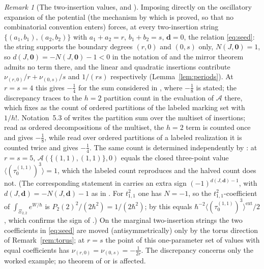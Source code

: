 \documentclass[11pt]{amsart}
\theoremstyle{definition}
\theoremstyle{remark}
\newtheorem{remark}[theorem]{Remark}
\newcommand{\Ascr}{\mathcal{A}}
\begin{document}
\begin{remark}[The two-insertion values, and {\cite[Ex.~5.5]{GKTsurvey}}]
\label{rem:ex55}
Imposing \cite[Thm.~0.3]{GKT} directly on the oscillatory expansion of the
potential (the mechanism by which \cite[Thm.~0.2]{GKT} is proved, so that no
combinatorial convention enters) forces, at every two-insertion string
$\{(a_{1},b_{1}),(a_{2},b_{2})\}$ with $a_{1}{+}a_{2}=r$, $b_{1}{+}b_{2}=s$,
$\mathbf d=0$, the relation \eqref{eq:seed}: the string supports the boundary
degrees $(r,0)$ and $(0,s)$ only, $N(J,\mathbf 0)=1$, so
$d(J,\mathbf 0)=-N(J,\mathbf 0)-1<0$ in the notation of \cite[Def.~4.8]{GKT} and
the mirror theorem admits no term there, and the linear and quadratic insertions contribute
$\nu_{(r,0)}/r+\nu_{(0,s)}/s$ and $1/(rs)$ respectively
(Lemma~\ref{lem:periods}).
At $r=s=4$ this gives $-\tfrac14$ for the sum considered in
\cite[Ex.~5.5]{GKTsurvey}, where $-\tfrac18$ is stated; the discrepancy traces to
the $h=2$ partition count in the evaluation of $\Ascr$ there, which
\cite[Notation~3.42 and Thm.~4.9]{GKT} fixes as the count of ordered partitions of the labeled
marking set with $1/h!$.  Notation~5.3 of \cite{GKTsurvey} writes the
partition sum over the multiset of insertions; read as ordered decompositions
of the multiset, the $h=2$ term is counted once and gives $-\tfrac18$, while
read over ordered partitions of a labeled realization it is counted twice and
gives $-\tfrac14$.  The same count is determined independently by
\cite[Cor.~5.11(3)]{GKT}: at $r=s=5$, $\Ascr(\{(1,1),(1,1)\},0)$ equals the closed
three-point value $\langle(\tau_{0}^{(1,1)})^{3}\rangle=1$, which the labeled
count reproduces and the halved count does not.  (The corresponding statement
in \cite[Cor.~0.6]{GKT} carries an extra sign $(-1)^{d(J,\mathbf d)-1}$, with
$d(J,\mathbf d)=-N(J,\mathbf d)-1$ as in \cite[Def.~4.8]{GKT}.  For $t_{1,1}^2$
one has $N=-1$, so the $t_{1,1}^2$-coefficient of
$\int_{\Xi_{2,2}}e^{W/\hbar}$ is $P_2(2)^2/(2\hbar^2)=1/(2\hbar^2)$; by
\cite[Thm.~0.3]{GKT} this equals $\hbar^{-2}\langle(\tau_{0}^{(1,1)})^{3}\rangle^{\mathrm{ext}}/2$,
which confirms the sign of \cite[Cor.~5.11(3)]{GKT}.) On
the marginal two-insertion strings the two
coefficients in \eqref{eq:seed} are moved (antisymmetrically) only by the torus
direction of Remark~\ref{rem:torus}; at $r=s$ the point of this
one-parameter set of values with equal coefficients has
$\nu_{(r,0)}=\nu_{(0,s)}=-\tfrac1{2r}$. The discrepancy concerns
only the worked example; no theorem of \cite{GKT} or \cite{GKTsurvey} is
affected.
\end{remark}
\end{document}
